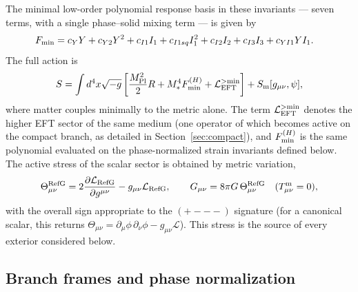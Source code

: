 \documentclass[12pt,a4paper]{article}
\begin{document}
The minimal low-order polynomial response basis in these invariants --- seven
terms, with a single phase--solid mixing term --- is given by
\begin{align*}
F_{\rm min}={}&
c_Y Y+c_{Y2}Y^2+c_{I1}I_1+c_{I1sq}I_1^2+c_{I2}I_2+c_{I3}I_3
+c_{YI1}YI_1.
\end{align*}
The full action is
\begin{align*}
S=\int d^4x\sqrt{-g}\left[
\frac{M_{\rm Pl}^2}{2}R+M_*^4 F_{\rm min}^{(H)}
+\mathcal L_{\rm EFT}^{>{\rm min}}
\right]+S_{\rm m}[g_{\mu\nu},\psi],
\end{align*}
where matter couples minimally to the metric alone. The term
$\mathcal L_{\rm EFT}^{>{\rm min}}$ denotes the higher EFT sector of the same
medium (one operator of which becomes active on the compact branch, as
detailed in Section~\ref{sec:compact}), and $F_{\rm min}^{(H)}$ is the same
polynomial evaluated on the phase-normalized strain invariants defined below.
The active stress of the scalar sector is obtained by metric variation,
\[
\Theta^{\rm RefG}_{\mu\nu}
=2\frac{\partial\mathcal L_{\rm RefG}}{\partial g^{\mu\nu}}
-g_{\mu\nu}\mathcal L_{\rm RefG},
\qquad
G_{\mu\nu}=8\pi G\,\Theta^{\rm RefG}_{\mu\nu}
\quad (T^{\rm m}_{\mu\nu}=0),
\]
with the overall sign appropriate to the $(+---)$ signature (for a canonical
scalar, this returns
$\Theta_{\mu\nu}=\partial_\mu\phi\,\partial_\nu\phi-g_{\mu\nu}\mathcal L$).
This stress is the source of every exterior considered below.

\subsection{Branch frames and phase normalization}
\label{sec:branches}
\end{document}
